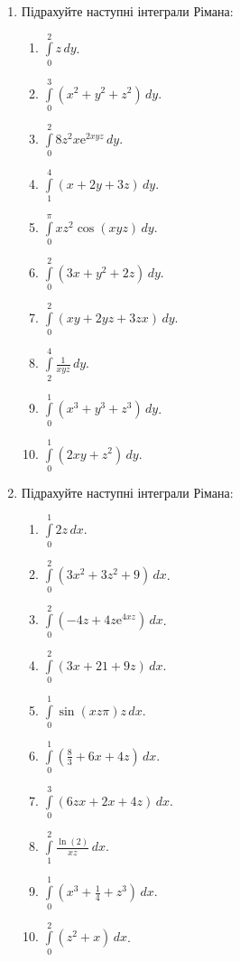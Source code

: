 \begin{enumerate}
\begin{enumerate}[label=\arabic*.]
    \end{enumerate}
\item Підрахуйте наступні інтеграли Рімана:
  \begin{enumerate}[label*=\arabic*.]
        \item $\int\limits_0^2 z \,dy$.
        \item $\int\limits_0^3 \left(x^2 + y^2 + z^2\right) \,dy$.
        \item $\int\limits_0^2 8 z^{2} x {\mathrm e}^{{2}{}{x}{}{y}{}{z}} \,dy$.
        \item $\int\limits_1^4 \left(x + 2y + 3z\right) \,dy$.
        \item $\int\limits_0^\pi {x}{}{z^{{2}}}{}{\cos}{\left({x}{}{y}{}{z}\right)} \,dy$.
        \item $\int\limits_0^2 \left(3x + y^2 + 2z\right) \,dy$.
        \item $\int\limits_0^2 \left(xy + 2yz + 3zx\right) \,dy$.
        \item $\int\limits_2^4 \frac{1}{xyz} \,dy$.
        \item $\int\limits_0^1 \left(x^3 + y^3 + z^3\right) \,dy$.
        \item $\int\limits_0^1 \left(2xy + z^2\right) \,dy$.
        \end{enumerate}
\item Підрахуйте наступні інтеграли Рімана:
    \begin{enumerate}[label*=\arabic*.]
        \item $\int\limits_0^1 2z \,dx$.
        \item $\int\limits_0^2 \left(3 x^{2}+3 z^{2}+9\right) \,dx$.
        \item $\int\limits_0^2 \left(-4 z+4 z {\mathrm e}^{4 x z}\right) \,dx$.
        \item $\int\limits_0^2 \left(3 x+21+9 z\right) \,dx$.
        \item $\int\limits_0^1 {\sin}{\left(x z \pi \right)} {z} \,dx$.
        \item $\int\limits_0^1 \left(\frac{8}{3}+6 x+4 z\right) \,dx$.
        \item $\int\limits_0^3 \left(6 z x+2 x+4 z\right) \,dx$.
        \item $\int\limits_1^2 \frac{\ln\! \left(2\right)}{x z} \,dx$.
        \item $\int\limits_0^1 \left({x^{3}+\frac{1}{4}+z^{3}}\right) \,dx$.
        \item $\int\limits_0^2 \left(z^{2}+x\right) \,dx$.
        \end{enumerate}
\end{enumerate}
